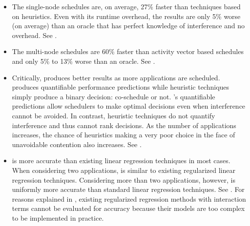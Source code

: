 \begin{itemize}
\item The single-node \SYSTEMESP{} schedules are, on average, 27\% faster
  than techniques based on heuristics.  Even with its runtime
  overhead, the \SYSTEMESP{} results are only 5\% worse (on average) than
  an oracle that has perfect knowledge of interference and no
  overhead. See .
\item The multi-node \SYSTEMESP{} schedules are 60\% faster than activity
  vector based schedules and only 5\% to 13\% worse than an oracle.
  See .
\item Critically, \SYSTEMESP{} produces better results as more
  applications are scheduled.  \SYSTEMESP{} produces quantifiable
  performance predictions while heuristic techniques simply produce a
  binary decision: co-schedule or not.  \SYSTEMESP{}'s quantifiable
  predictions allow schedulers to make optimal decisions even when
  interference cannot be avoided. In contrast, heuristic techniques do
  not quantify interference and thus cannot rank decisions.  As the
  number of applications increases, the chance of heuristics making a
  very poor choice in the face of unavoidable contention also
  increases.  See .
\item \SYSTEMESP{} is more accurate than existing linear regression
  techniques in most cases.  When considering two applications,
  \SYSTEMESP{} is similar to existing regularized linear regression
  techniques.  Considering more than two applications, however,
  \SYSTEMESP{} is uniformly more accurate than standard linear regression
  techniques.  See .  For reasons explained in
  , existing regularized regression methods with
  interaction terms cannot be evaluated for accuracy because their
  models are too complex to be implemented in practice.
\end{itemize}

